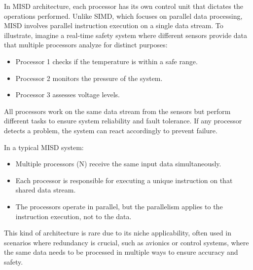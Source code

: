 \documentclass[a4paper, 10pt]{book}
\begin{document}
                In MISD architecture, each processor has its own control unit that dictates the operations performed. Unlike SIMD, which focuses on parallel data processing, MISD involves parallel instruction execution on a single data stream. To illustrate, imagine a real-time safety system where different sensors provide data that multiple processors analyze for distinct purposes:

                \begin{itemize}
                    
                    \item {\bold Processor 1} checks if the temperature is within a safe range.
                
                    \item {\bold Processor 2} monitors the pressure of the system.

                    \item {\bold Processor 3} assesses voltage levels.

                \end{itemize}

                All processors work on the same data stream from the sensors but perform different tasks to ensure system reliability and fault tolerance. If any processor detects a problem, the system can react accordingly to prevent failure.

                In a typical MISD system:

                \begin{itemize}

                    \item Multiple processors (N) receive the same input data simultaneously.

                    \item Each processor is responsible for executing a unique instruction on that shared data stream.

                    \item The processors operate in parallel, but the parallelism applies to the instruction execution, not to the data.

                \end{itemize}

                This kind of architecture is rare due to its niche applicability, often used in scenarios where redundancy is crucial, such as avionics or control systems, where the same data needs to be processed in multiple ways to ensure accuracy and safety.
\end{document}
